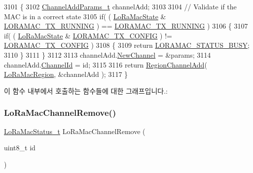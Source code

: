 \begin{DoxyCode}
3101 \{
3102     \mbox{\hyperlink{structs_channel_add_params}{ChannelAddParams\_t}} channelAdd;
3103 
3104     \textcolor{comment}{// Validate if the MAC is in a correct state}
3105     \textcolor{keywordflow}{if}( ( \mbox{\hyperlink{_lo_ra_mac_8c_a53bc4ca09907ed24a1be62fa76c310ca}{LoRaMacState}} & \mbox{\hyperlink{_lo_ra_mac_8c_ada0bdc03d52b5bf536f021dcea7c4490a5b4a3679d3966d49741f0aec6b15d731}{LORAMAC\_TX\_RUNNING}} ) == 
      \mbox{\hyperlink{_lo_ra_mac_8c_ada0bdc03d52b5bf536f021dcea7c4490a5b4a3679d3966d49741f0aec6b15d731}{LORAMAC\_TX\_RUNNING}} )
3106     \{
3107         \textcolor{keywordflow}{if}( ( \mbox{\hyperlink{_lo_ra_mac_8c_a53bc4ca09907ed24a1be62fa76c310ca}{LoRaMacState}} & \mbox{\hyperlink{_lo_ra_mac_8c_ada0bdc03d52b5bf536f021dcea7c4490ad649702e2b40e41dbed3ff5b2e3c21c5}{LORAMAC\_TX\_CONFIG}} ) != 
      \mbox{\hyperlink{_lo_ra_mac_8c_ada0bdc03d52b5bf536f021dcea7c4490ad649702e2b40e41dbed3ff5b2e3c21c5}{LORAMAC\_TX\_CONFIG}} )
3108         \{
3109             \textcolor{keywordflow}{return} \mbox{\hyperlink{group___l_o_r_a_m_a_c_gga1d18f26b344040b3ec5c3db662919661a66b12f569207eacd97ee1c1d6c4cee6d}{LORAMAC\_STATUS\_BUSY}};
3110         \}
3111     \}
3112 
3113     channelAdd.\mbox{\hyperlink{structs_channel_add_params_afc31493a105479490228fd896b20b45c}{NewChannel}} = &params;
3114     channelAdd.\mbox{\hyperlink{structs_channel_add_params_ae23f953dc29c360e56a3c856404a3276}{ChannelId}} = id;
3115 
3116     \textcolor{keywordflow}{return} \mbox{\hyperlink{group___r_e_g_i_o_n_gaaa5767f33e988a641abf509ad278ae14}{RegionChannelAdd}}( \mbox{\hyperlink{_lo_ra_mac_8c_ab3e53bd4a0f4e547c9dbf450406acfe5}{LoRaMacRegion}}, &channelAdd );
3117 \}
\end{DoxyCode}
이 함수 내부에서 호출하는 함수들에 대한 그래프입니다.\+:
\mbox{\label{group___l_o_r_a_m_a_c_gafad6c929a33557ac2fd4000bcacd9453}} 
\subsubsection{\texorpdfstring{Lo\+Ra\+Mac\+Channel\+Remove()}{LoRaMacChannelRemove()}}
{\footnotesize\ttfamily \mbox{\hyperlink{group___l_o_r_a_m_a_c_ga30bd25657e10480f8605ee951b0ecfbd}{Lo\+Ra\+Mac\+Status\+\_\+t}} Lo\+Ra\+Mac\+Channel\+Remove (\begin{DoxyParamCaption}\item[{uint8\+\_\+t}]{id }\end{DoxyParamCaption})}



